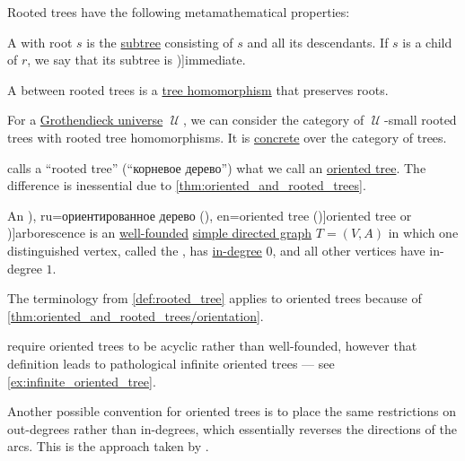 \begin{definition}
  Rooted trees have the following metamathematical properties:
  \begin{thmenum}[resume=def:rooted_tree]
     A  with root \( s \) is the \hyperref[def:tree/subtree]{subtree} consisting of \( s \) and all its descendants. If \( s \) is a child of \( r \), we say that its subtree is \term[en=subtree of the root (\cite[308]{Stanley2012EnumerativeCombinatoricsVol1})]{immediate}.

    \mimprovised A  between rooted trees is a \hyperref[def:tree/homomorphism]{tree homomorphism} that preserves roots.

    \mimprovised For a \hyperref[def:grothendieck_universe]{Grothendieck universe} \( \mscrU \), we can consider the category of \( \mscrU \)-small rooted trees with rooted tree homomorphisms. It is \hyperref[def:concrete_category]{concrete} over the category of trees.
  \end{thmenum}
\end{definition}
\begin{comments}
  \item {} calls a \enquote{rooted tree} (\enquote{корневое дерево}) what we call an \hyperref[def:oriented_tree]{oriented tree}. The difference is inessential due to \cref{thm:oriented_and_rooted_trees}.
\end{comments}

\begin{definition}\label{def:oriented_tree}\mimprovised
  An \term[bg=ориентирано дърво (\cite[21]{Мирчев2001Графи}), ru=ориентированное дерево (\cite[def. 5.6]{БелоусовТкачёв2004ДискретнаяМатематика}), en=oriented tree (\cite[373]{Knuth1997ArtVol1})]{oriented tree} or \term[en=arborescence (\cite[\S 3.1]{GondranMinoux1984GraphsAndAlgorithms})]{arborescence} is an \hyperref[def:well_founded_graph]{well-founded} \hyperref[def:directed_graph]{simple directed graph} \( T = (V, A) \) in which one distinguished vertex, called the , has \hyperref[def:graph_cardinality/directed_degree]{in-degree} \( 0 \), and all other vertices have in-degree \( 1 \).
\end{definition}
\begin{comments}
  \item The terminology from \cref{def:rooted_tree} applies to oriented trees because of \cref{thm:oriented_and_rooted_trees/orientation}.

  \item {} require oriented trees to be acyclic rather than well-founded, however that definition leads to pathological infinite oriented trees --- see \cref{ex:infinite_oriented_tree}.

  \item Another possible convention for oriented trees is to place the same restrictions on out-degrees rather than in-degrees, which essentially reverses the directions of the arcs. This is the approach taken by .
\end{comments}

